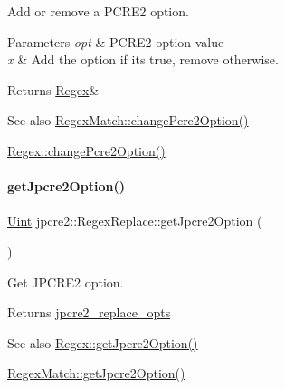 Add or remove a P\+C\+R\+E2 option. 


\begin{DoxyParams}{Parameters}
{\em opt} & P\+C\+R\+E2 option value \\
\hline
{\em x} & Add the option if it\textquotesingle{}s true, remove otherwise. \\
\hline
\end{DoxyParams}
\begin{DoxyReturn}{Returns}
\hyperlink{classjpcre2_1_1Regex}{Regex}\& 
\end{DoxyReturn}
\begin{DoxySeeAlso}{See also}
\hyperlink{classjpcre2_1_1RegexMatch_a6893abc21b24a9d9fca146a33c0f823c_a6893abc21b24a9d9fca146a33c0f823c}{Regex\+Match\+::change\+Pcre2\+Option()} 

\hyperlink{classjpcre2_1_1Regex_ae5bde8008cc5a700163ca3162dbd5823_ae5bde8008cc5a700163ca3162dbd5823}{Regex\+::change\+Pcre2\+Option()} 
\end{DoxySeeAlso}
\hypertarget{classjpcre2_1_1RegexReplace_addc36e1c991b639d549a32d1151c04df_addc36e1c991b639d549a32d1151c04df}{}\label{classjpcre2_1_1RegexReplace_addc36e1c991b639d549a32d1151c04df_addc36e1c991b639d549a32d1151c04df} 
\paragraph{\texorpdfstring{get\+Jpcre2\+Option()}{getJpcre2Option()}}
{\footnotesize\ttfamily \hyperlink{namespacejpcre2_a078242d38221a13fb3543b9edd78c099}{Uint} jpcre2\+::\+Regex\+Replace\+::get\+Jpcre2\+Option (\begin{DoxyParamCaption}{ }\end{DoxyParamCaption})\hspace{0.3cm}{\ttfamily [inline]}}



Get J\+P\+C\+R\+E2 option. 

\begin{DoxyReturn}{Returns}
\hyperlink{classjpcre2_1_1RegexReplace_acf13bcb16918df4b7bcaa7e49a1c7d59}{jpcre2\+\_\+replace\+\_\+opts} 
\end{DoxyReturn}
\begin{DoxySeeAlso}{See also}
\hyperlink{classjpcre2_1_1Regex_a5d2d04eb7c393338a4c8cce941e957ef_a5d2d04eb7c393338a4c8cce941e957ef}{Regex\+::get\+Jpcre2\+Option()} 

\hyperlink{classjpcre2_1_1RegexMatch_a4ea72774ae5e9a93d649dcb0840efd7f_a4ea72774ae5e9a93d649dcb0840efd7f}{Regex\+Match\+::get\+Jpcre2\+Option()} 
\end{DoxySeeAlso}
\hypertarget{classjpcre2_1_1RegexReplace_a4c325837716be3a48e2f92a80790d49f_a4c325837716be3a48e2f92a80790d49f}{}\label{classjpcre2_1_1RegexReplace_a4c325837716be3a48e2f92a80790d49f_a4c325837716be3a48e2f92a80790d49f} 
